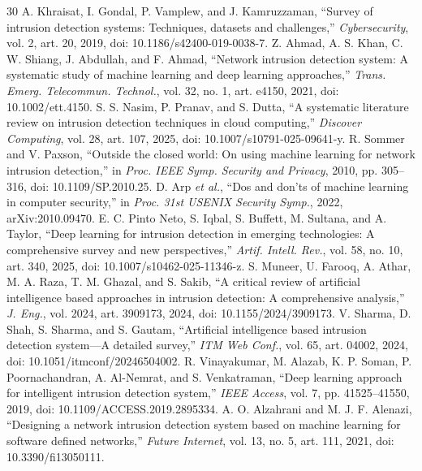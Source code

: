 \documentclass[conference]{IEEEtran}
\begin{document}

\begin{thebibliography}{30}
 A. Khraisat, I. Gondal, P. Vamplew, and J. Kamruzzaman, ``Survey of intrusion detection systems: Techniques, datasets and challenges,'' \textit{Cybersecurity}, vol. 2, art. 20, 2019, doi: 10.1186/s42400-019-0038-7.
 Z. Ahmad, A. S. Khan, C. W. Shiang, J. Abdullah, and F. Ahmad, ``Network intrusion detection system: A systematic study of machine learning and deep learning approaches,'' \textit{Trans. Emerg. Telecommun. Technol.}, vol. 32, no. 1, art. e4150, 2021, doi: 10.1002/ett.4150.
 S. S. Nasim, P. Pranav, and S. Dutta, ``A systematic literature review on intrusion detection techniques in cloud computing,'' \textit{Discover Computing}, vol. 28, art. 107, 2025, doi: 10.1007/s10791-025-09641-y.
 R. Sommer and V. Paxson, ``Outside the closed world: On using machine learning for network intrusion detection,'' in \textit{Proc. IEEE Symp. Security and Privacy}, 2010, pp. 305--316, doi: 10.1109/SP.2010.25.
 D. Arp \textit{et al.}, ``Dos and don'ts of machine learning in computer security,'' in \textit{Proc. 31st USENIX Security Symp.}, 2022, arXiv:2010.09470.
 E. C. Pinto Neto, S. Iqbal, S. Buffett, M. Sultana, and A. Taylor, ``Deep learning for intrusion detection in emerging technologies: A comprehensive survey and new perspectives,'' \textit{Artif. Intell. Rev.}, vol. 58, no. 10, art. 340, 2025, doi: 10.1007/s10462-025-11346-z.
 S. Muneer, U. Farooq, A. Athar, M. A. Raza, T. M. Ghazal, and S. Sakib, ``A critical review of artificial intelligence based approaches in intrusion detection: A comprehensive analysis,'' \textit{J. Eng.}, vol. 2024, art. 3909173, 2024, doi: 10.1155/2024/3909173.
 V. Sharma, D. Shah, S. Sharma, and S. Gautam, ``Artificial intelligence based intrusion detection system---A detailed survey,'' \textit{ITM Web Conf.}, vol. 65, art. 04002, 2024, doi: 10.1051/itmconf/20246504002.
 R. Vinayakumar, M. Alazab, K. P. Soman, P. Poornachandran, A. Al-Nemrat, and S. Venkatraman, ``Deep learning approach for intelligent intrusion detection system,'' \textit{IEEE Access}, vol. 7, pp. 41525--41550, 2019, doi: 10.1109/ACCESS.2019.2895334.
 A. O. Alzahrani and M. J. F. Alenazi, ``Designing a network intrusion detection system based on machine learning for software defined networks,'' \textit{Future Internet}, vol. 13, no. 5, art. 111, 2021, doi: 10.3390/fi13050111.

\end{thebibliography}
\end{document}
